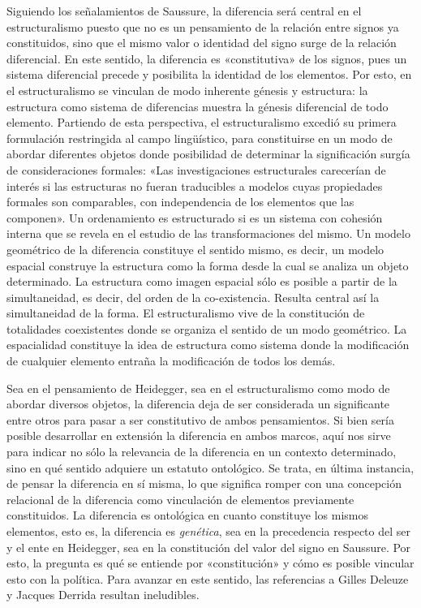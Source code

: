 Siguiendo los señalamientos de Saussure, la diferencia será central en el estructuralismo puesto que no es un pensamiento de la relación entre signos ya constituidos, sino que el mismo valor o identidad del signo surge de la relación diferencial. En este sentido, la diferencia es «constitutiva» de los signos, pues un sistema diferencial precede y posibilita la identidad de los elementos. Por esto, en el estructuralismo se vinculan de modo inherente génesis y estructura: la estructura como sistema de diferencias muestra la génesis diferencial de todo elemento. Partiendo de esta perspectiva, el estructuralismo excedió su primera formulación restringida al campo lingüístico, para constituirse en un modo de abordar diferentes objetos donde posibilidad de determinar la significación surgía de consideraciones formales: «Las investigaciones estructurales carecerían de interés si las estructuras no fueran traducibles a modelos cuyas propiedades formales son comparables, con independencia de los elementos que las componen». Un ordenamiento es estructurado si es un sistema con cohesión interna que se revela en el estudio de las transformaciones del mismo. Un modelo geométrico de la diferencia constituye el sentido mismo, es decir, un modelo espacial construye la estructura como la forma desde la cual se analiza un objeto determinado. La estructura como imagen espacial sólo es posible a partir de la simultaneidad, es decir, del orden de la co-existencia. Resulta central así la simultaneidad de la forma. El estructuralismo vive de la constitución de totalidades coexistentes donde se organiza el sentido de un modo geométrico. La espacialidad constituye la idea de estructura como sistema donde la modificación de cualquier elemento entraña la modificación de todos los demás.

Sea en el pensamiento de Heidegger, sea en el estructuralismo como modo de abordar diversos objetos, la diferencia deja de ser considerada un significante entre otros para pasar a ser constitutivo de ambos pensamientos. Si bien sería posible desarrollar en extensión la diferencia en ambos marcos, aquí nos sirve para indicar no sólo la relevancia de la diferencia en un contexto determinado, sino en qué sentido adquiere un estatuto ontológico. Se trata, en última instancia, de pensar la diferencia en sí misma, lo que significa romper con una concepción relacional de la diferencia como vinculación de elementos previamente constituidos. La diferencia es ontológica en cuanto constituye los mismos elementos, esto es, la diferencia es \emph{genética}, sea en la precedencia respecto del ser y el ente en Heidegger, sea en la constitución del valor del signo en Saussure. Por esto, la pregunta es qué se entiende por «constitución» y cómo es posible vincular esto con la política. Para avanzar en este sentido, las referencias a Gilles Deleuze y Jacques Derrida resultan ineludibles.

